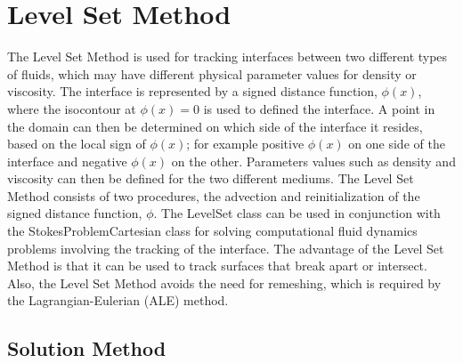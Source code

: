 \section{Level Set Method}

The Level Set Method is used for tracking interfaces between two different types of fluids, which may have different physical parameter values for density or viscosity. The interface is represented by a signed distance function, $\phi(x)$, where the isocontour at $\phi(x)=0$ is used to defined the interface. A point in the domain can then be determined on which side of the interface it resides, based on the local sign of $\phi(x)$; for example positive $\phi(x)$ on one side of the interface and negative $\phi(x)$ on the other. Parameters values such as density and viscosity can then be defined for the two different mediums. The Level Set Method consists of two procedures, the advection and reinitialization of the signed distance function, $\phi$. The LevelSet class can be used in conjunction with the StokesProblemCartesian class for solving computational fluid dynamics problems involving the tracking of the interface. The advantage of the Level Set Method is that it can be used to track surfaces that break apart or intersect. Also, the Level Set Method avoids the need for remeshing, which is required by the Lagrangian-Eulerian (ALE) method. 


\subsection{Solution Method}

